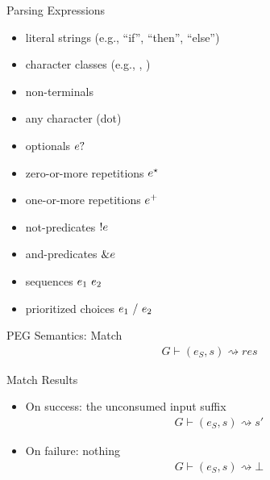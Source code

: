 \documentclass{beamer}
\begin{document}
\begin{frame}{Parsing Expressions}
    \begin{itemize}
        \item literal strings (e.g., ``if'', ``then'', ``else'')
        \item character classes (e.g., , )
        \item non-terminals
        \item any character (dot)
        \item optionals $e?$
        \item zero-or-more repetitions $e^\star$
        \item one-or-more repetitions $e^+$
        \item not-predicates $!e$
        \item and-predicates $\&e$
        \item sequences $e_1\ e_2$
        \item prioritized choices $e_1\ /\ e_2$
    \end{itemize}
\end{frame}

\newcommand{\FordMatch}[4]{#1 \vdash (#2, #3) \rightsquigarrow #4}

\begin{frame}{PEG Semantics: Match}
    \begin{align*}
        \FordMatch{G}{e_S}{s}{res}
    \end{align*}
\end{frame}

\begin{frame}{Match Results}
    \begin{itemize}
        \item On success: the unconsumed input suffix
        \begin{align*}
            \FordMatch{G}{e_S}{s}{s'}
        \end{align*}
        \item On failure: nothing
        \begin{align*}
            \FordMatch{G}{e_S}{s}{\bot}
        \end{align*}
    \end{itemize}
\end{frame}
\end{document}
